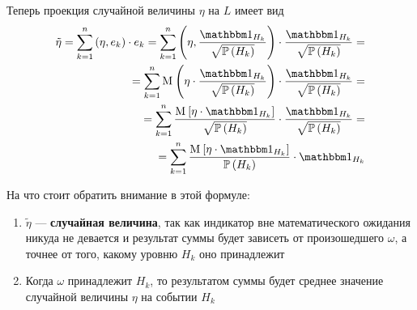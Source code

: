Теперь проекция случайной величины $\eta$ на $L$ имеет вид
\begin{equation}\label{discreteConditionalExpectation}
  \begin{split}
  \tilde{\eta}
  = \sum_{k=1}^n \left( \eta, e_k \right) \cdot e_k
  = \sum_{k=1}^n
      \left( \eta, \frac{\indicatorof{H_k}}{\sqrt{\probability{H_k}}} \right) 
      \cdot \frac{\indicatorof{H_k}}{\sqrt{\probability{H_k}}} = \\
  = \sum_{k=1}^n
      \mean{\left( \eta
      \cdot \frac{\indicatorof{H_k}}{\sqrt{\probability{H_k}}} \right)}
      \cdot \frac{\indicatorof{H_k}}{\sqrt{\probability{H_k}}} = \\
  = \sum_{k=1}^n
      \frac{\Mean{ \eta \cdot \indicatorof{H_k} }}
      {\sqrt{\probability{H_k}}}
      \cdot \frac{\indicatorof{H_k}}{\sqrt{\probability{H_k}}} = \\
  = \sum_{k=1}^n
      \frac{\Mean{\eta \cdot \indicatorof{H_k}}}{\probability{H_k}}
      \cdot \indicatorof{H_k}
  \end{split}
\end{equation}

На что стоит обратить внимание в этой формуле:
\begin{enumerate}
  \item $\tilde{\eta}$ --- \textbf{случайная величина},
      так как индикатор вне математического ожидания никуда не девается
      и результат суммы будет зависеть от произошедшего $\omega$,
      а точнее от того, какому уровню $H_k$ оно принадлежит
  \item Когда $\omega$ принадлежит $H_k$,
      то результатом суммы будет среднее значение случайной величины $\eta$
      на событии $H_k$
\end{enumerate}

